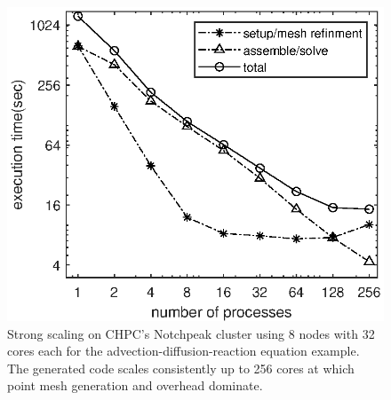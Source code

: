 \documentclass[twoside,leqno,twocolumn]{article}
\begin{document}
\begin{figure}
\label{fig:scaling}
\includegraphics[width=\linewidth]{figures/scaling.eps}
\caption{Strong scaling on CHPC's Notchpeak cluster using 8 nodes with 32 cores each for the advection-diffusion-reaction equation example. The generated code scales consistently up to 256 cores at which point mesh generation and overhead dominate.}
\end{figure}
\end{document}
